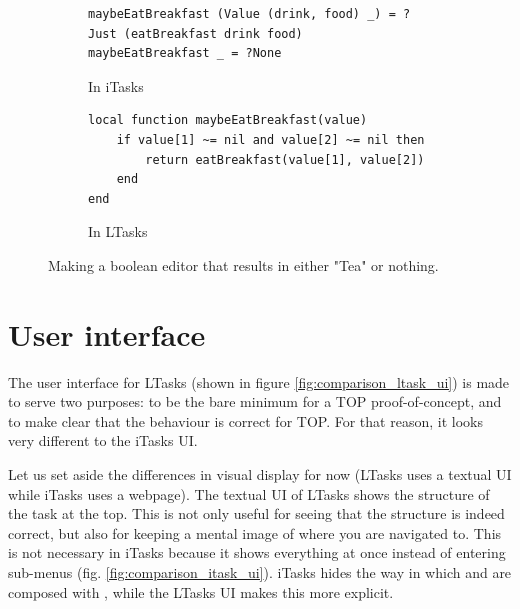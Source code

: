 \begin{figure}[ht]
\begin{subfigure}{\textwidth}
\centering
\begin{verbatim}
maybeEatBreakfast (Value (drink, food) _) = ?Just (eatBreakfast drink food)
maybeEatBreakfast _ = ?None
\end{verbatim}
\caption{In iTasks}
\label{lst:comparison_maybe_clean}
\end{subfigure}
\begin{subfigure}{\textwidth}
\centering
\bigskip %
\begin{verbatim}
local function maybeEatBreakfast(value)
    if value[1] ~= nil and value[2] ~= nil then
        return eatBreakfast(value[1], value[2])
    end
end
\end{verbatim}
\caption{In LTasks}
\label{lst:comparison_maybe_lua}
\end{subfigure}
\caption{Making a boolean editor that results in either "Tea" or nothing.}
\label{lst:comparison_maybe}
\end{figure}

\section{User interface}
The user interface for LTasks (shown in figure \ref{fig:comparison_ltask_ui}) is made to serve two purposes: to be the bare minimum for a TOP proof-of-concept, and to make clear that the behaviour is correct for TOP. For that reason, it looks very different to the iTasks UI.

Let us set aside the differences in visual display for now (LTasks uses a textual UI while iTasks uses a webpage). The textual UI of LTasks shows the structure of the task at the top. This is not only useful for seeing that the structure is indeed correct, but also for keeping a mental image of where you are navigated to. This is not necessary in iTasks because it shows everything at once instead of entering sub-menus (fig. \ref{fig:comparison_itask_ui}). iTasks hides the way in which  and  are composed with , while the LTasks UI makes this more explicit.

